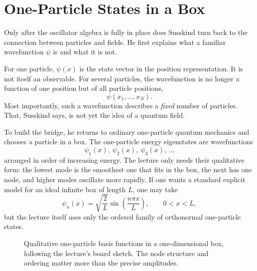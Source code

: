 \section{One-Particle States in a Box}

Only after the oscillator algebra is fully in place does Susskind turn back to the connection between particles and fields. He first explains what a familiar wavefunction \(\psi\) is and what it is not.

For one particle, \(\psi(x)\) is the state vector in the position representation. It is not itself an observable. For several particles, the wavefunction is no longer a function of one position but of all particle positions,
\begin{equation}
\psi(x_1,\ldots,x_N).
\end{equation}
Most importantly, such a wavefunction describes a \emph{fixed} number of particles. That, Susskind says, is not yet the idea of a quantum field.

To build the bridge, he returns to ordinary one-particle quantum mechanics and chooses a particle in a box. The one-particle energy eigenstates are wavefunctions
\begin{equation}
\psi_1(x),\ \psi_2(x),\ \psi_3(x),\ \ldots
\end{equation}
arranged in order of increasing energy. The lecture only needs their qualitative form: the lowest mode is the smoothest one that fits in the box, the next has one node, and higher modes oscillate more rapidly. If one wants a standard explicit model for an ideal infinite box of length \(L\), one may take
\begin{equation}
\psi_n(x)=\sqrt{\frac{2}{L}}\sin\!\left(\frac{n\pi x}{L}\right),
\qquad 0<x<L,
\end{equation}
but the lecture itself uses only the ordered family of orthonormal one-particle states.

\begin{figure}[ht]
\centering
{}
\caption{Qualitative one-particle basis functions in a one-dimensional box, following the lecture's board sketch. The node structure and ordering matter more than the precise amplitudes.}
\end{figure}

